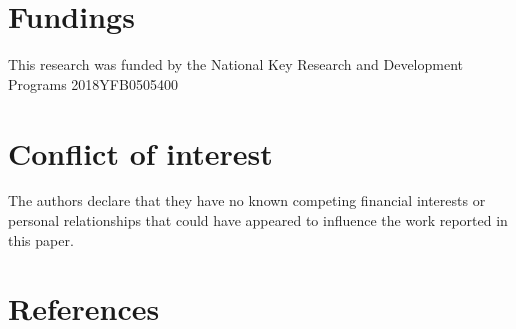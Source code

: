 \documentclass[final,3p,times]{elsarticle}
\begin{document}

	\section*{Fundings}
This research was funded by the National Key Research and Development Programs 2018YFB0505400
	\section*{Conflict of interest}
	The authors declare that they have no known competing financial interests or personal relationships that could have appeared to influence the work reported in this paper.
	\section*{References} 
	
	
\end{document}
